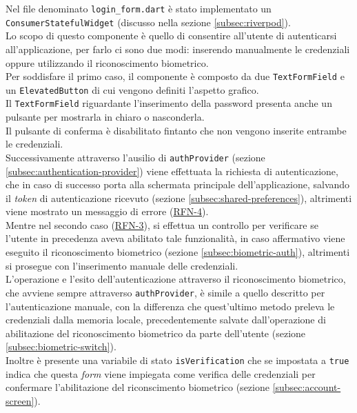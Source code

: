 Nel file denominato \lstinline{login_form.dart} è stato implementato un \lstinline{ConsumerStatefulWidget} (discusso nella sezione \ref{subsec:riverpod}).\\
Lo scopo di questo componente è quello di consentire all'utente di autenticarsi all'applicazione, per farlo ci sono due modi: inserendo manualmente le credenziali oppure utilizzando il riconoscimento biometrico.\\
Per soddisfare il primo caso, il componente è composto da due \lstinline{TextFormField}\cite{site:text-form-field} e un \lstinline{ElevatedButton}\cite{site:elevated-button} di cui vengono definiti l'aspetto grafico.\\
Il \lstinline{TextFormField} riguardante l'inserimento della password presenta anche un pulsante per mostrarla in chiaro o nasconderla.\\
Il pulsante di conferma è disabilitato fintanto che non vengono inserite entrambe le credenziali.\\
Successivamente attraverso l'ausilio di \lstinline{authProvider} (sezione \ref{subsec:authentication-provider}) viene effettuata la richiesta di autenticazione, che in caso di successo porta alla schermata principale dell'applicazione, salvando il \emph{token} di autenticazione ricevuto (sezione \ref{subsec:shared-preferences}), altrimenti viene mostrato un messaggio di errore (\hyperref[RFN-4]{RFN-4}).\\ 
Mentre nel secondo caso (\hyperref[RFN-3]{RFN-3}), si effettua un controllo per verificare se l'utente in precedenza aveva abilitato tale funzionalità, in caso affermativo viene eseguito il riconoscimento biometrico (sezione \ref{subsec:biometric-auth}), altrimenti si prosegue con l'inserimento manuale delle credenziali.\\
L'operazione e l'esito dell'autenticazione attraverso il riconoscimento biometrico, che avviene sempre attraverso \lstinline{authProvider}, è simile a quello descritto per l'autenticazione manuale, con la differenza che quest'ultimo metodo preleva le credenziali dalla memoria locale, precedentemente salvate dall'operazione di abilitazione del riconoscimento biometrico da parte dell'utente (sezione \ref{subsec:biometric-switch}). \\
Inoltre è presente una variabile di stato \lstinline{isVerification} che se impostata a \lstinline{true} indica che questa \emph{form} viene impiegata come verifica delle credenziali per confermare l'abilitazione del riconscimento biometrico (sezione \ref{subsec:account-screen}).

